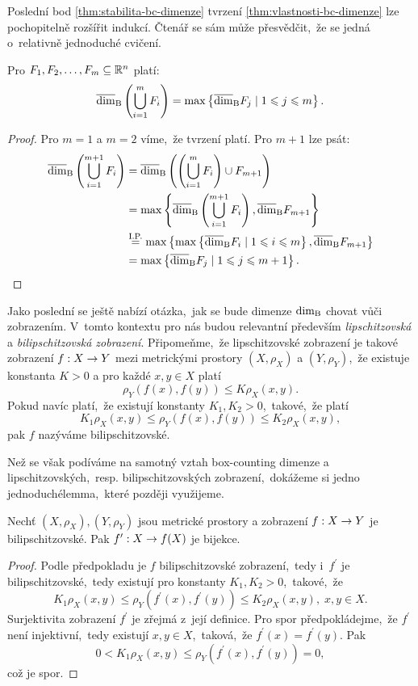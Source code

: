 Poslední bod \ref{thm:stabilita-bc-dimenze} tvrzení \ref{thm:vlastnosti-bc-dimenze} lze pochopitelně rozšířit indukcí. Čtenář se sám může přesvědčit,~že se jedná o~relativně jednoduché cvičení.
\begin{corollary}\label{cor:stabilita-bc-dimenze-obecne}
    Pro $F_1,F_2,\ldots,F_m\subseteq\mathbb{R}^n$ platí:
    \[\overline{\dim}_\textup{B}\left(\bigcup_{i=1}^m F_i\right)=\max\left\{\overline{\dim}_\textup{B}{F_j}\mid 1\leqslant j\leqslant m\right\}.\]
\end{corollary}
\begin{proof}
    Pro $m=1$ a $m=2$ víme,~že tvrzení platí. Pro $m+1$ lze psát:
    \begin{align*}
        \overline{\dim}_\textup{B}\left(\bigcup_{i=1}^{m+1}F_i\right)&=\overline{\dim}_\textup{B}\left(\left(\bigcup_{i=1}^{m}F_i\right)\cup F_{m+1}\right)\\
        &=\max\left\{\overline{\dim}_\textup{B}\left(\bigcup_{i=1}^{m+1}F_i\right),\overline{\dim}_\textup{B}{F_{m+1}}\right\}\\
        &\stackrel{\text{I.P.}}{=}\max\left\{\max\left\{\overline{\dim}_\textup{B}{F_i}\mid 1\leqslant i\leqslant m\right\},\overline{\dim}_\textup{B}{F_{m+1}}\right\}\\
        &=\max\left\{\overline{\dim}_\textup{B}{F_j}\mid 1\leqslant j\leqslant m+1\right\}.
    \end{align*}
\end{proof}

Jako poslední se ještě nabízí otázka,~jak se bude dimenze $\operatorname{dim_B}$ chovat vůči zobrazením. V~tomto kontextu pro nás budou relevantní především \emph{lipschitzovská} a \emph{bilipschitzovská zobrazení}. Připomeňme,~že lipschitzovské zobrazení je takové zobrazení $f:X \rightarrow Y$ mezi metrickými prostory $(X,\rho_X)$ a $(Y,\rho_Y)$,~že existuje konstanta $K>0$ a pro každé $x,y\in X$ platí
\[\rho_Y(f(x),f(y))\leqslant K\rho_X(x,y).\]
Pokud navíc platí,~že existují konstanty $K_1,K_2>0$,~takové,~že platí
\[K_1\rho_X(x,y)\leqslant\rho_Y(f(x),f(y))\leqslant K_2\rho_X(x,y),\]
pak $f$ nazýváme bilipschitzovské.

Než se však podíváme na samotný vztah box-counting dimenze a lipschitzovských,~resp. bilipschitzovských zobrazení,~dokážeme si jedno jednoduché\linebreak{}lemma,~které později využijeme.
\begin{lemma}\label{lem:lipschitzovska-zobrazeni-a-bijekce}
    Nechť $(X,\rho_X),(Y,\rho_Y)$ jsou metrické prostory a zobrazení $f:X \rightarrow Y$ je bilipschitzovské. Pak $f^\prime:X \rightarrow f(X)$ je bijekce.
\end{lemma}
\begin{proof}
    Podle předpokladu je $f$ bilipschitzovské zobrazení,~tedy i~$f^\prime$ je bilipschitzovské,~tedy existují pro konstanty $K_1,K_2>0$,~takové,~že
    \[K_1\rho_X(x,y)\leqslant\rho_Y(f^\prime(x),f^\prime(y))\leqslant K_2\rho_X(x,y),\;x,y\in X.\]
    Surjektivita zobrazení $f^\prime$ je zřejmá z~její definice. Pro spor předpokládejme,~že $f^\prime$ není injektivní,~tedy existují $x,y\in X$,~taková,~že $f^\prime(x)=f^\prime(y)$. Pak
    \[0<K_1\rho_X(x,y)\leqslant\rho_Y(f^\prime(x),f^\prime(y))=0,\]
    což je spor.
\end{proof}

